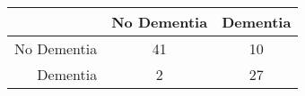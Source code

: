 \begin{table}[ht]
\centering
\begin{tabular}{r|c|c}
  \hline
 & No Dementia & Dementia \\ 
  \hline
No Dementia & 41 & 10 \\ 
  Dementia & 2 & 27 \\ 
   \hline
\end{tabular}
\end{table}
